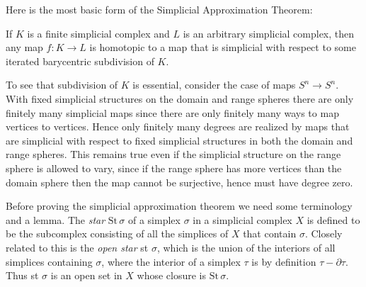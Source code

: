 Here is the most basic form of the Simplicial Approximation Theorem:

\begin{theorem}
\label{thm:simplicial-approximation}
If $K$ is a finite simplicial complex and $L$ is an arbitrary simplicial complex, then any map $f : K \to L$ is homotopic to a map that is simplicial with respect to some iterated barycentric subdivision of $K$.
\end{theorem}

To see that subdivision of $K$ is essential, consider the case of maps $S^n \to S^n$. With fixed simplicial structures on the domain and range spheres there are only finitely many simplicial maps since there are only finitely many ways to map vertices to vertices. Hence only finitely many degrees are realized by maps that are simplicial with respect to fixed simplicial structures in both the domain and range spheres. This remains true even if the simplicial structure on the range sphere is allowed to vary, since if the range sphere has more vertices than the domain sphere then the map cannot be surjective, hence must have degree zero.

Before proving the simplicial approximation theorem we need some terminology and a lemma. The \textit{star} $\text{St}\,\sigma$ of a simplex $\sigma$ in a simplicial complex $X$ is defined to be the subcomplex consisting of all the simplices of $X$ that contain $\sigma$. Closely related to this is the \textit{open star} st $\sigma$, which is the union of the interiors of all simplices containing $\sigma$, where the interior of a simplex $\tau$ is by definition $\tau - \partial \tau$. Thus st $\sigma$ is an open set in $X$ whose closure is $\text{St}\,\sigma$.

